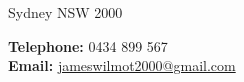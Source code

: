 
\vspace{-1in}
{\huge \name}


\bigskip

\begin{minipage}[t]{0.672\textwidth}
Sydney NSW 2000
\end{minipage}
\begin{minipage}[t]{0.48\textwidth}
\textbf{Telephone:} 0434 899 567\\
\textbf{Email:} \href{mailto:jameswilmot2000@gmail.com}{jameswilmot2000@gmail.com} \\
\end{minipage}
